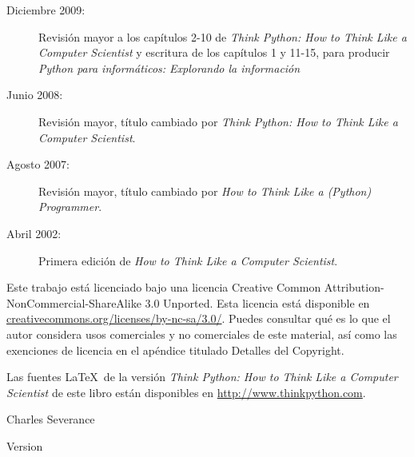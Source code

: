 \begin{latexonly}
{\begin{description}
\item[Diciembre 2009:] Revisión mayor a los capítulos 2-10 de
\emph{Think Python: How to Think Like
a Computer Scientist}
y escritura de los capítulos 1 y 11-15, para
producir 
\emph{Python para informáticos: Explorando la información}

\item[Junio 2008:] Revisión mayor, título cambiado por
\emph{Think Python: How to Think Like
a Computer Scientist}.

\item[Agosto 2007:] Revisión mayor, título cambiado por
\emph{How to Think Like a (Python) Programmer}.

\item[Abril 2002:] Primera edición de \emph{How to Think Like
a Computer Scientist}.

\end{description}

\vspace{0.2in}

Este trabajo está licenciado bajo una licencia
Creative Common
Attribution-NonCommercial-ShareAlike 3.0 Unported.
Esta licencia está
disponible en
\url{creativecommons.org/licenses/by-nc-sa/3.0/}. Puedes
consultar qué es lo que el autor considera usos comerciales y no comerciales
de este material, así como las exenciones de licencia
en el apéndice titulado Detalles del Copyright.

Las fuentes \LaTeX\ de la versión 
\emph{Think Python: How to Think Like
	a Computer Scientist}
de este libro están disponibles en
\url{http://www.thinkpython.com}.

\vspace{0.2in}

} %

\end{latexonly}



\begin{htmlonly}


{\Large \thetitle}

{\large 
Charles Severance}

Version \theversion

\setcounter{chapter}{-1}

\end{htmlonly}

